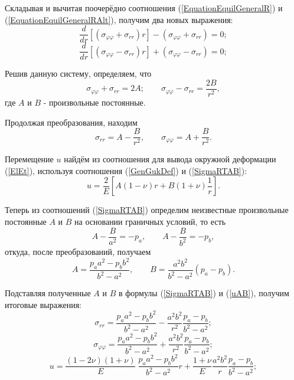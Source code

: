 \documentclass[a4paper,14pt]{extarticle}
\begin{document}
Складывая и вычитая поочерёдно соотношения (\ref{EquationEquilGeneralR}) и (\ref{EquationEquilGeneralRAlt}), получим два новых выражения:
\begin{equation*}
\frac{d}{dr}\left[(\sigma_{\varphi\varphi}+\sigma_{rr}) r\right]-(\sigma_{\varphi\varphi}+\sigma_{rr})=0;
\end{equation*}
\begin{equation*}
\frac{d}{dr}\left[(\sigma_{\varphi\varphi}-\sigma_{rr}) r\right]+(\sigma_{\varphi\varphi}-\sigma_{rr})=0;
\end{equation*}

Решив данную систему, определяем, что
\begin{equation*}
\sigma_{\varphi\varphi}+\sigma_{rr}=2A; \qquad \sigma_{\varphi\varphi}-\sigma_{rr}=\frac{2B}{r^{2}},
\end{equation*}
где $A$ и $B$ - произвольные постоянные. 

Продолжая преобразования, находим
\begin{equation}\label{SigmaRTAB}
\sigma_{rr}=A-\frac{B}{r^2}, \qquad \sigma_{\varphi\varphi}=A+\frac{B}{r^2}.
\end{equation}

Перемещение $u$ найдём из соотношения для вывода окружной деформации (\ref{ElEt}), используя соотношения (\ref{GenGukDef}) и (\ref{SigmaRTAB}):
\begin{equation}\label{uAB}
u=\frac{2}{E}\left[A(1-\nu)r+B(1+\nu)\frac{1}{r}\right].
\end{equation} 

Теперь из соотношений (\ref{SigmaRTAB}) определим неизвестные произвольные постоянные $A$ и $B$ на основании граничных условий, то есть 
\begin{equation*}
A-\frac{B}{a^2}=-p_a, \qquad A-\frac{B}{b^2}=-p_b,
\end{equation*}
откуда, после преобразований, получаем
\begin{equation*}
A=\frac{p_{a} a^{2}-p_{b} b^2}{b^2 - a^2}, \qquad B=\frac{a^2 b^2}{b^2 -a^2}(p_a -p_b).
\end{equation*}

Подставляя полученные $A$ и $B$ в формулы (\ref{SigmaRTAB}) и (\ref{uAB}), получим итоговые выражения:
\begin{equation}\label{ElasticSigmaRResult}
\sigma_{rr}=\frac{p_a a^2 - p_b b^2}{b^2-a^2}-\frac{a^2 b^2}{r^2}\frac{p_a -p_b}{b^2 -a^2};
\end{equation}
\begin{equation}\label{ElasticSigmaTResult}
\sigma_{\varphi\varphi}=\frac{p_a a^2 - p_b b^2}{b^2-a^2}+\frac{a^2 b^2}{r^2}\frac{p_a -p_b}{b^2 -a^2};
\end{equation}	
\begin{equation}\label{ElasticUResult}
u=\frac{\left(1-2\nu\right)\left(1+\nu\right)}{E}\ \frac{p_a a^2 -p_b b^2}{b^2-a^2}r+\frac{1+\nu}{E}\frac{a^2 b^2}{r}\frac{p_a -p_b}{b^2-a^2};
\end{equation}
\end{document}
